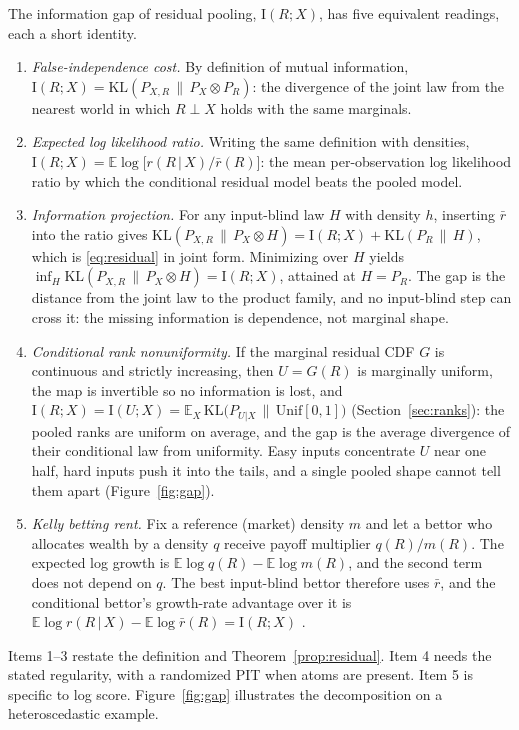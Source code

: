 \documentclass[11pt]{article}
\theoremstyle{remark}
\newcommand{\E}{\mathbb{E}}
\newcommand{\KL}{\mathrm{KL}}
\newcommand{\I}{\mathrm{I}}
\newcommand{\given}{\,|\,}
\begin{document}
The information gap of residual pooling, $\I(R;X)$, has five equivalent readings, each a
short identity.
\begin{enumerate}
\item \emph{False-independence cost.} By definition of mutual information,
$\I(R;X)=\KL(P_{X,R}\,\|\,P_X\otimes P_R)$: the divergence of the joint law from the
nearest world in which $R\perp X$ holds with the same marginals.
\item \emph{Expected log likelihood ratio.} Writing the same definition with densities,
$\I(R;X)=\E\log\big[r(R\given X)/\bar r(R)\big]$: the mean per-observation log
likelihood ratio by which the conditional residual model beats the pooled model.
\item \emph{Information projection.} For any input-blind law $H$ with density $h$, inserting
$\bar r$ into the ratio gives
$\KL(P_{X,R}\,\|\,P_X\otimes H)=\I(R;X)+\KL(P_R\,\|\,H)$, which is
\eqref{eq:residual} in joint form. Minimizing over $H$ yields
$\inf_H\KL(P_{X,R}\,\|\,P_X\otimes H)=\I(R;X)$, attained at $H=P_R$. The gap is the
distance from the joint law to the product family, and no input-blind step can cross it: the
missing information is dependence, not marginal shape.
\item \emph{Conditional rank nonuniformity.} If the marginal residual CDF $G$ is continuous
and strictly increasing, then $U=G(R)$ is marginally uniform, the map is invertible so no
information is lost, and
$\I(R;X)=\I(U;X)=\E_X\,\KL\big(P_{U|X}\,\|\,\mathrm{Unif}[0,1]\big)$
(Section~\ref{sec:ranks}): the pooled ranks are uniform on average, and the gap is the
average divergence of their conditional law from uniformity. Easy inputs concentrate $U$ near
one half, hard inputs push it into the tails, and a single pooled shape cannot tell them
apart (Figure~\ref{fig:gap}).
\item \emph{Kelly betting rent.} Fix a reference (market) density $m$ and let a bettor who
allocates wealth by a density $q$ receive payoff multiplier $q(R)/m(R)$. The expected log
growth is $\E\log q(R)-\E\log m(R)$, and the second term does not depend on $q$. The best input-blind bettor therefore
uses $\bar r$, and the conditional bettor's growth-rate advantage over it is
$\E\log r(R\given X)-\E\log\bar r(R)=\I(R;X)$
\citep{kelly1956new,barron1988bound}.
\end{enumerate}
Items 1--3 restate the definition and Theorem~\ref{prop:residual}. Item 4 needs the
stated regularity, with a randomized PIT when atoms are present. Item 5 is specific to log
score. Figure~\ref{fig:gap} illustrates the decomposition
on a heteroscedastic example.
\end{document}
